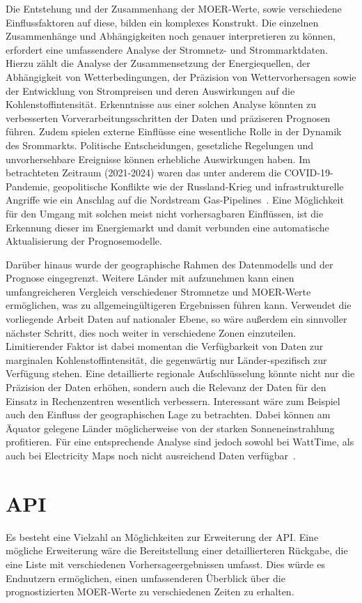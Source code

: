Die Entstehung und der Zusammenhang der \ac{MOER}-Werte, sowie verschiedene Einflussfaktoren auf diese, bilden ein komplexes Konstrukt.
Die einzelnen Zusammenhänge und Abhängigkeiten noch genauer interpretieren zu können, erfordert eine umfassendere Analyse der Stromnetz- und Strommarktdaten.
Hierzu zählt die Analyse der Zusammensetzung der Energiequellen, der Abhängigkeit von Wetterbedingungen, der Präzision von Wettervorhersagen sowie der Entwicklung von Strompreisen und deren Auswirkungen auf die Kohlenstoffintensität.
Erkenntnisse aus einer solchen Analyse könnten zu verbesserten Vorverarbeitungsschritten der Daten und präziseren Prognosen führen.
Zudem spielen externe Einflüsse eine wesentliche Rolle in der Dynamik des Srommarkts.
Politische Entscheidungen, gesetzliche Regelungen und unvorhersehbare Ereignisse können erhebliche Auswirkungen haben.
Im betrachteten Zeitraum (2021-2024) waren das unter anderem die COVID-19-Pandemie, geopolitische Konflikte wie der Russland-Krieg und infrastrukturelle Angriffe wie ein Anschlag auf die Nordstream Gas-Pipelines~\cite{Baumgartner.30.09.2022}.
Eine Möglichkeit für den Umgang mit solchen meist nicht vorhersagbaren Einflüssen, ist die Erkennung dieser im Energiemarkt und damit verbunden eine automatische Aktualisierung der Prognosemodelle.

Darüber hinaus wurde der geographische Rahmen des Datenmodells und der Prognose eingegrenzt.
Weitere Länder mit aufzunehmen kann einen umfangreicheren Vergleich verschiedener Stromnetze und \ac{MOER}-Werte ermöglichen, was zu allgemeingültigeren Ergebnissen führen kann.
Verwendet die vorliegende Arbeit Daten auf nationaler Ebene, so wäre außerdem ein sinnvoller nächster Schritt, dies noch weiter in verschiedene Zonen einzuteilen.
Limitierender Faktor ist dabei momentan die Verfügbarkeit von Daten zur marginalen Kohlenstoffintensität, die gegenwärtig nur Länder-spezifisch zur Verfügung stehen.
Eine detaillierte regionale Aufschlüsselung könnte nicht nur die Präzision der Daten erhöhen, sondern auch die Relevanz der Daten für den Einsatz in Rechenzentren wesentlich verbessern.
Interessant wäre zum Beispiel auch den Einfluss der geographischen Lage zu betrachten.
Dabei können am Äquator gelegene Länder möglicherweise von der starken Sonneneinstrahlung profitieren.
Für eine entsprechende Analyse sind jedoch sowohl bei WattTime, als auch bei Electricity Maps noch nicht ausreichend Daten verfügbar~\cite{WattTime.20230823}\cite{ElectricityMaps.20240305T20:54:29.000Z}.

\section{API}
Es besteht eine Vielzahl an Möglichkeiten zur Erweiterung der \ac{API}.
Eine mögliche Erweiterung wäre die Bereitstellung einer detaillierteren Rückgabe, die eine Liste mit verschiedenen Vorhersageergebnissen umfasst.
Dies würde es Endnutzern ermöglichen, einen umfassenderen Überblick über die prognostizierten \ac{MOER}-Werte zu verschiedenen Zeiten zu erhalten.

